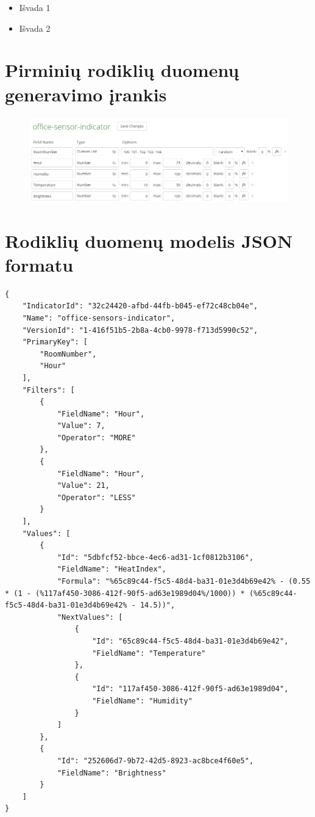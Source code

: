\documentclass{VUMIFPSbakalaurinis}
\begin{document}
\begin{itemize}
    \item Išvada 1
    \item Išvada 2 
\end{itemize}

\printbibliography[heading=bibintoc] 

\appendix 

\section{Pirminių rodiklių duomenų generavimo įrankis}\label{add:mockaroo}
\begin{figure}[H]
    \centering
    \includegraphics[width=1\textwidth]{img/generated-data.png}
    \label{img:generated-data}
\end{figure}

\section{Rodiklių duomenų modelis JSON formatu}\label{add:initial-json}
\begin{lstlisting}
{
    "IndicatorId": "32c24420-afbd-44fb-b045-ef72c48cb04e",
    "Name": "office-sensors-indicator",
    "VersionId": "1-416f51b5-2b8a-4cb0-9978-f713d5990c52",
    "PrimaryKey": [
        "RoomNumber",
        "Hour"
    ],
    "Filters": [
        {
            "FieldName": "Hour",
            "Value": 7,
            "Operator": "MORE"
        },
        {
            "FieldName": "Hour",
            "Value": 21,
            "Operator": "LESS"
        }
    ],
    "Values": [
        {
            "Id": "5dbfcf52-bbce-4ec6-ad31-1cf0812b3106",
            "FieldName": "HeatIndex",
            "Formula": "%65c89c44-f5c5-48d4-ba31-01e3d4b69e42% - (0.55 * (1 - (%117af450-3086-412f-90f5-ad63e1989d04%/1000)) * (%65c89c44-f5c5-48d4-ba31-01e3d4b69e42% - 14.5))",
            "NextValues": [
                {
                    "Id": "65c89c44-f5c5-48d4-ba31-01e3d4b69e42",
                    "FieldName": "Temperature"
                },
                {
                    "Id": "117af450-3086-412f-90f5-ad63e1989d04",
                    "FieldName": "Humidity"
                }
            ]
        },
        {
            "Id": "252606d7-9b72-42d5-8923-ac8bce4f60e5",
            "FieldName": "Brightness"
        }
    ]
}
\end{lstlisting}
\end{document}

